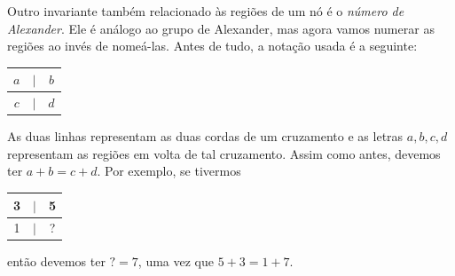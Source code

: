 	Outro invariante também relacionado às regiões de um nó é o \textit{número de Alexander}. 
	Ele é análogo ao grupo de Alexander, mas agora vamos numerar as regiões ao invés de nomeá-las. 
	Antes de tudo, a notação usada é a seguinte:
	\begin{center}
		\begin{tabular}{ccc}
			$a$ & $\vert$ & $b$ \\
			\hline 
			$c$ & $\vert$ & $d$
		\end{tabular}
	\end{center}
	As duas linhas representam as duas cordas de um cruzamento e as letras $a,b,c,d$ representam 
	as regiões em volta de tal cruzamento. Assim como antes, devemos ter $a+b=c+d$. 
	Por exemplo, se tivermos
	\begin{center}
		\begin{tabular}{ccc}
			3 & $\vert$ & 5 \\
			\hline 
			1 & $\vert$ & ?
		\end{tabular}
	\end{center}
	então devemos ter $?=7$, uma vez que $5+3=1+7$.
	
